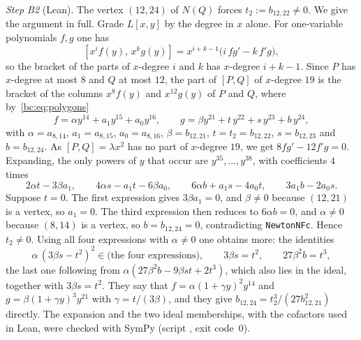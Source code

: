 \documentclass[a4paper,11pt]{article}
\newcommand{\filename}[1]{\texttt{\seqsplit{#1}}}
\theoremstyle{jsplain}
\theoremstyle{jsdef}
\theoremstyle{jsrem}
\begin{document}
\emph{Step B2} (Lean). The vertex $(12,24)$ of $N(Q)$ forces $t_2:=b_{12,22}\neq0$. We give the argument in full. Grade $L[x,y]$ by the degree in $x$ alone. For one-variable polynomials $f,g$ one has
\[
[x^if(y),\,x^kg(y)]=x^{i+k-1}\bigl(i\,fg'-k\,f'g\bigr),
\]
so the bracket of the parts of $x$-degree $i$ and $k$ has $x$-degree $i+k-1$. Since $P$ has $x$-degree at most $8$ and $Q$ at most $12$, the part of $[P,Q]$ of $x$-degree $19$ is the bracket of the columns $x^8f(y)$ and $x^{12}g(y)$ of $P$ and $Q$, where by~\eqref{bc:eq:polygons}
\[
f=\alpha y^{14}+a_1y^{15}+a_0y^{16},\qquad g=\beta y^{21}+t\,y^{22}+s\,y^{23}+b\,y^{24},
\]
with $\alpha=a_{8,14}$, $a_1=a_{8,15}$, $a_0=a_{8,16}$, $\beta=b_{12,21}$, $t=t_2=b_{12,22}$, $s=b_{12,23}$ and $b=b_{12,24}$. As $[P,Q]=\lambda x^2$ has no part of $x$-degree $19$, we get $8fg'-12f'g=0$. Expanding, the only powers of $y$ that occur are $y^{35},\dots,y^{38}$, with coefficients $4$ times
\begin{equation}\label{bc:eq:edge19}
2\alpha t-3\beta a_1,\qquad 4\alpha s-a_1t-6\beta a_0,\qquad 6\alpha b+a_1s-4a_0t,\qquad 3a_1b-2a_0s .
\end{equation}
Suppose $t=0$. The first expression gives $3\beta a_1=0$, and $\beta\neq0$ because $(12,21)$ is a vertex, so $a_1=0$. The third expression then reduces to $6\alpha b=0$, and $\alpha\neq0$ because $(8,14)$ is a vertex, so $b=b_{12,24}=0$, contradicting \texttt{NewtonNFc}. Hence $t_2\neq0$. Using all four expressions with $\alpha\neq0$ one obtains more: the identities
\[
\alpha\,(3\beta s-t^2)^2\in\bigl(\text{the four expressions}\bigr),\qquad 3\beta s=t^2,\qquad 27\beta^2b=t^3,
\]
the last one following from $\alpha(27\beta^2b-9\beta st+2t^3)$, which also lies in the ideal, together with $3\beta s=t^2$. They say that $f=\alpha(1+\gamma y)^2y^{14}$ and $g=\beta(1+\gamma y)^3y^{21}$ with $\gamma=t/(3\beta)$, and they give $b_{12,24}=t_2^3/(27b_{12,21}^2)$ directly. The expansion and the two ideal memberships, with the cofactors used in Lean, were checked with SymPy (script \filename{c4\_edge19.py}, exit code~$0$).
\end{document}
